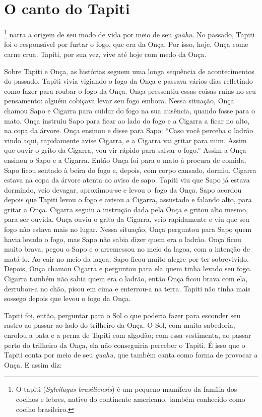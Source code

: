 \chapter{O canto do Tapiti}

\footnote{O tapiti (\emph{Sylvilagus brasiliensis}) é um pequeno
  mamífero da família dos coelhos e lebres, nativo do continente
  americano, também conhecido como coelho brasileiro.} narra a origem de
seu modo de vida por meio de seu \emph{guahu}. No passado, Tapiti foi o
responsável por furtar o fogo, que era da Onça. Por isso, hoje, Onça
come carne crua. Tapiti, por sua vez, vive até hoje com medo da Onça.

Sobre Tapiti e Onça, as histórias seguem uma longa sequência de
acontecimentos do passado. Tapiti vivia vigiando o fogo da Onça e
passava vários dias refletindo como fazer para roubar o fogo da Onça.
Onça pressentiu essas coisas ruins no seu pensamento: alguém cobiçava
levar seu fogo embora. Nessa situação, Onça chamou Sapo e Cigarra para
cuidar do fogo na sua ausência, quando fosse para o mato. Onça instruiu
Sapo para ficar ao lado do fogo e a Cigarra a ficar no alto, na copa da
árvore. Onça ensinou e disse para Sapo: ``Caso você perceba o ladrão
vindo aqui, rapidamente avise Cigarra, e a Cigarra vai gritar para mim.
Assim que ouvir o grito da Cigarra, vou vir rápido para salvar o fogo.''
Assim a Onça ensinou o Sapo e a Cigarra. Então Onça foi para o mato à
procura de comida, Sapo ficou sentado à beira do fogo e, depois, com
corpo cansado, dormiu. Cigarra estava na copa da árvore atenta ao aviso
de sapo. Tapiti viu que Sapo já estava dormindo, veio devagar,
aproximou-se e levou o~fogo da Onça. Sapo acordou depois que Tapiti
levou o fogo e avisou a Cigarra, assustado e falando alto, para gritar a
Onça. Cigarra seguiu a instrução dada pela Onça e gritou alto mesmo,
para ser ouvida. Onça ouviu o grito da Cigarra, veio rapidamente e viu
que seu fogo não estava mais no lugar. Nessa situação, Onça perguntou
para Sapo quem havia levado o fogo, mas Sapo não sabia dizer quem era o
ladrão. Onça ficou muito brava, pegou o Sapo e o arremessou no meio da
lagoa, com a intenção de matá-lo. Ao cair no meio da lagoa, Sapo ficou
muito alegre por ter sobrevivido. Depois, Onça chamou Cigarra e
perguntou para ela quem tinha levado seu fogo. Cigarra também não sabia
quem era o ladrão, então Onça ficou brava com ela, derrubou-a no chão,
pisou em cima e enterrou-a na terra. Tapiti não tinha mais sossego
depois que levou o fogo da Onça.

Tapiti foi, então, perguntar para o Sol o que poderia fazer para
esconder seu rastro ao passar ao lado do trilheiro da Onça. O Sol, com
muita sabedoria, enrolou a pata e a perna de Tapiti com algodão; com
essa vestimenta, ao passar perto do trilheiro da Onça, ela não
conseguiria perceber o Tapiti. É isso que o Tapiti conta por meio de seu
\emph{guahu}, que também canta como forma de provocar a Onça. E assim
diz:

